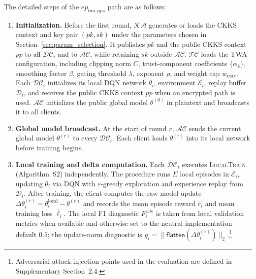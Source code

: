 \documentclass[journal]{IEEEtran}
\begin{document}
The detailed steps of the $ep_{\mathrm{twa\text{-}ppa}}$ path are as follows:

\begin{enumerate}

\item \textbf{Initialization.}
Before the first round, $\mathcal{KA}$ generates or loads the CKKS context and
key pair $(pk,sk)$ under the parameters chosen in
Section~\ref{sec:param_selection}. It publishes $pk$ and the public CKKS
context $pp$ to all $\mathcal{DC}_i$ and to $\mathcal{AC}$, while retaining $sk$
outside $\mathcal{AC}$. $\mathcal{TC}$ loads the TWA configuration, including
clipping norm $C$, trust-component coefficients $\{\alpha_k\}$, smoothing
factor $\beta$, gating threshold $\lambda$, exponent $\rho$, and weight cap $w_{\max}$.
Each $\mathcal{DC}_i$ initializes its local DQN network $\theta_i$,
environment $\mathcal{E}_i$, replay buffer $\mathcal{D}_i$, and receives the public
CKKS context $pp$ when an encrypted path is used. $\mathcal{AC}$ initializes the public
global model $\theta^{(0)}$ in plaintext and broadcasts it to all clients.

\item \textbf{Global model broadcast.}
At the start of round $r$, $\mathcal{AC}$ sends the current global model
$\theta^{(r)}$ to every $\mathcal{DC}_i$. Each client loads $\theta^{(r)}$
into its local network before training begins.

\item \textbf{Local training and delta computation.}
Each $\mathcal{DC}_i$ executes \textsc{LocalTrain} (Algorithm~S2)
independently. The procedure runs $E$ local episodes in $\mathcal{E}_i$,
updating $\theta_i$ via DQN with $\varepsilon$-greedy exploration and experience
replay from $\mathcal{D}_i$. After training, the client computes the raw model
update $\Delta\theta_i^{(r)}=\theta_i^{\mathrm{local}}-\theta^{(r)}$ and records the
mean episode reward $\bar{r}_i$ and mean training loss $\bar{\ell}_i$. The local
F1 diagnostic $F_i^{\mathrm{raw}}$ is taken from local validation metrics when
available and otherwise set to the neutral implementation default $0.5$; the
update-norm diagnostic is $g_i=\|\mathsf{flatten}(\Delta\theta_i^{(r)})\|_2$.\footnote{
Adversarial attack-injection points used in the evaluation are defined in
Supplementary Section~2.4.}


\end{enumerate}
\end{document}
